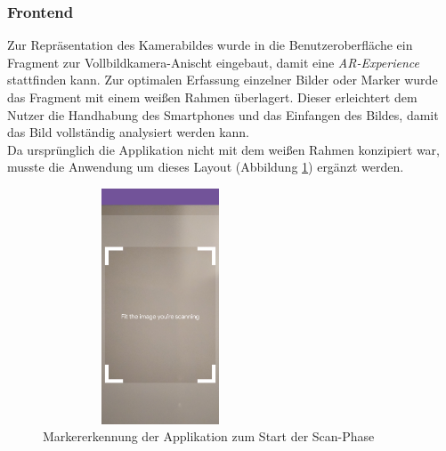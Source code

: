 \subsubsection{Frontend}
Zur Repräsentation des Kamerabildes wurde in die Benutzeroberfläche ein Fragment zur Vollbildkamera-Anischt eingebaut, damit eine \textit{\acs{AR}-Experience} 
stattfinden kann. Zur optimalen Erfassung einzelner Bilder oder Marker wurde das Fragment mit einem weißen Rahmen überlagert. Dieser erleichtert dem Nutzer die 
Handhabung des Smartphones und das Einfangen des Bildes, damit das Bild vollständig analysiert werden kann. 
\\ 
\linebreak
Da ursprünglich die Applikation nicht mit dem weißen Rahmen konzipiert war, musste die Anwendung um dieses Layout (Abbildung \ref{pic:image_tracking}) 
ergänzt werden. 
\begin{figure}[hbt!]
    \centering
    \includegraphics[width=7cm,height=7cm,keepaspectratio]{4Umsetzung/Bilder/image_tracking.jpg}
    \caption{Markererkennung der Applikation zum Start der Scan-Phase}
    \label{pic:image_tracking}
\end{figure}
\pagebreak 
\\
